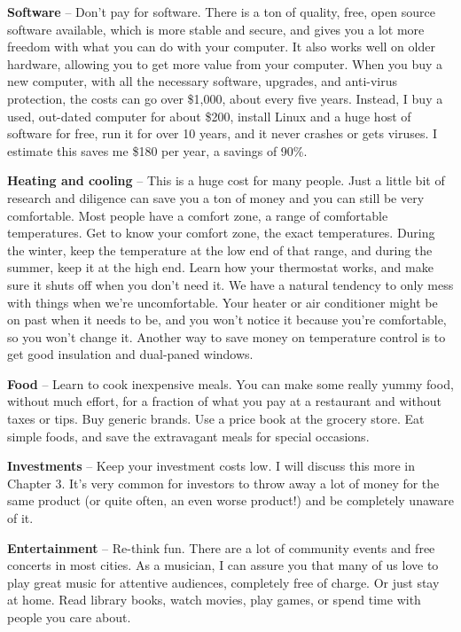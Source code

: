 \textbf{Software} -- Don't pay for software. There is a ton of quality, free, open source software available, which is more stable and secure, and gives you a lot more freedom with what you can do with your computer. It also works well on older hardware, allowing you to get more value from your computer. When you buy a new computer, with all the necessary software, upgrades, and anti-virus protection, the costs can go over \$1,000, about every five years. Instead, I buy a used, out-dated computer for about \$200, install Linux and a huge host of software for free, run it for over 10 years, and it never crashes or gets viruses. I estimate this saves me \$180 per year, a savings of 90\%.

\textbf{Heating and cooling} -- This is a huge cost for many people. Just a little bit of research and diligence can save you a ton of money and you can still be very comfortable. Most people have a comfort zone, a range of comfortable temperatures. Get to know your comfort zone, the exact temperatures. During the winter, keep the temperature at the low end of that range, and during the summer, keep it at the high end. Learn how your thermostat works, and make sure it shuts off when you don't need it. We have a natural tendency to only mess with things when we're uncomfortable. Your heater or air conditioner might be on past when it needs to be, and you won't notice it because you're comfortable, so you won't change it. Another way to save money on temperature control is to get good insulation and dual-paned windows.

\textbf{Food} -- Learn to cook inexpensive meals. You can make some really yummy food, without much effort, for a fraction of what you pay at a restaurant and without taxes or tips. Buy generic brands. Use a price book at the grocery store. Eat simple foods, and save the extravagant meals for special occasions.

\textbf{Investments} -- Keep your investment costs low. I will discuss this more in Chapter 3. It's very common for investors to throw away a lot of money for the same product (or quite often, an even worse product!) and be completely unaware of it.

\textbf{Entertainment} -- Re-think fun. There are a lot of community events and free concerts in most cities. As a musician, I can assure you that many of us love to play great music for attentive audiences, completely free of charge. Or just stay at home. Read library books, watch movies, play games, or spend time with people you care about.

